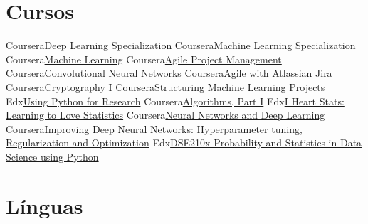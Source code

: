 \documentclass[11pt,a4paper,sans]{moderncv}        %
\begin{document}
\section{Cursos}
\cvdoubleitem
{Coursera}{\href{https://www.coursera.org/account/accomplishments/specialization/certificate/Q3RT6P3BF5XU}{Deep Learning Specialization}}
{Coursera}{\href{https://www.coursera.org/account/accomplishments/specialization/YHKBDQ77K2GB}{Machine Learning Specialization}}
\cvdoubleitem
{Coursera}{\href{https://www.coursera.org/account/accomplishments/verify/CWFKK68KQP9X}{\small{Machine Learning}}}
{Coursera}{\href{https://www.coursera.org/api/legacyCertificates.v1/spark/statementOfAccomplishment/976353~15102768/pdf}{\small{Agile Project Management}}}
\cvdoubleitem
{Coursera}{\href{https://www.coursera.org/account/accomplishments/verify/5A8K3WTQHAZF}{\small{Convolutional Neural Networks}}}
{Coursera}{\href{https://www.coursera.org/account/accomplishments/certificate/ZTZR93WKX3JV}{\small{Agile with Atlassian Jira}}}
\cvdoubleitem
{Coursera}{\href{https://www.coursera.org/api/legacyCertificates.v1/spark/statementOfAccomplishment/976353~15102768/pdf}{\small{Cryptography I}}}
{Coursera}{\href{https://www.coursera.org/account/accomplishments/verify/BBTE8KJC6WRU}{\footnotesize{Structuring Machine Learning Projects}}}
\cvdoubleitem
{Edx}{\href{https://www.edx.org/course/using-python-for-research}{\small{Using Python for Research}}}
{Coursera}{\href{https://www.coursera.org/learn/algorithms-part1}{\small{Algorithms, Part I}}}
\cvdoubleitem
{Edx}{\href{https://www.edx.org/course/i-heart-stats-learning-love-statistics-notredamex-soc120x}{\scriptsize{I Heart Stats: Learning to Love Statistics}}}
{Coursera}{\href{https://www.coursera.org/account/accomplishments/verify/RY4DLN2Q6MW3}{\footnotesize{Neural Networks and Deep Learning}}}
\cvdoubleitem
{Coursera}{\href{https://www.coursera.org/account/accomplishments/verify/6SEWP83D96QM}{\scriptsize{Improving Deep Neural Networks: Hyperparameter tuning, Regularization and Optimization}}}
{Edx}{\href{https://www.edx.org/course/probability-and-statistics-in-data-science-using-python}{\scriptsize{DSE210x Probability and Statistics in Data Science using Python}}}

\section{Línguas}
\end{document}
